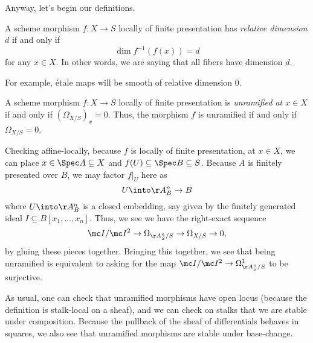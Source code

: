 \documentclass[../notes.tex]{subfiles}
\begin{document}
Anyway, let's begin our definitions.
\begin{definition}
	A scheme morphism $f\colon X\to S$ locally of finite presentation has \textit{relative dimension $d$} if and only if
	\[\dim f^{-1}(f(x))=d\]
	for any $x\in X$. In other words, we are saying that all fibers have dimension $d$.
\end{definition}
For example, \'etale maps will be smooth of relative dimension $0$.
\begin{definition}[unramified]
	A scheme morphism $f\colon X\to S$ locally of finite presentation is \textit{unramified at $x\in X$} if and only if $(\Omega_{X/S})_x=0$. Thus, the morphism $f$ is unramified if and only if $\Omega_{X/S}=0$.
\end{definition}
\begin{remark}
	Checking affine-locally, because $f$ is locally of finite presentation, at $x\in X$, we can place $x\in\Spec A\subseteq X$ and $f(U)\subseteq\Spec B\subseteq S$. Because $A$ is finitely presented over $B$, we may factor $f|_U$ here as
	\[U\into\AA^n_B\to B\]
	where $U\into\AA^n_B$ is a closed embedding, say given by the finitely generated ideal $I\subseteq B[x_1,\ldots,x_n]$. Thus, we see we have the right-exact sequence
	\[\mc I/\mc I^2\to\Omega_{\AA^n_S/S}\to\Omega_{X/S}\to0,\]
	by gluing these pieces together. Bringing this together, we see that being unramified is equivalent to asking for the map $\mc I/\mc I^2\to\Omega^1_{\AA^n_S/S}$ to be surjective.
\end{remark}
As usual, one can check that unramified morphisms have open locus (because the definition is stalk-local on a sheaf), and we can check on stalks that we are stable under composition. Because the pullback of the sheaf of differentials behaves in squares, we also see that unramified morphisms are stable under base-change.
\end{document}
